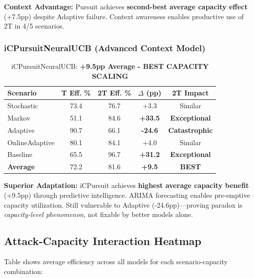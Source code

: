 \documentclass[11pt,a4paper]{article}
\newcommand{\critical}[1]{\textcolor{criticalcolor}{\textbf{#1}}}
\newcommand{\success}[1]{\textcolor{successcolor}{\textbf{#1}}}
\begin{document}
\vspace{-0.2cm}
\textbf{Context Advantage:} Pursuit achieves \success{second-best average capacity effect} (+7.5pp) despite Adaptive failure. Context awareness enables productive use of 2T in 4/5 scenarios.

\subsubsection{iCPursuitNeuralUCB (Advanced Context Model)}

\vspace{-0.4cm}
\begin{table}[H]
\scriptsize
\centering
\begin{tabular}{lcccc}
\toprule
\textbf{Scenario} & \textbf{T Eff. \%} & \textbf{2T Eff. \%} & \textbf{$\Delta$ (pp)} & \textbf{2T Impact} \\
\midrule
Stochastic & 73.4 & 76.7 & +3.3 & Similar \\
Markov & 51.1 & 84.6 & \success{+33.5} & \success{Exceptional} \\
Adaptive & 90.7 & 66.1 & \critical{-24.6} & \critical{Catastrophic} \\
OnlineAdaptive & 80.1 & 84.1 & +4.0 & Similar \\
Baseline & 65.5 & 96.7 & \success{+31.2} & \success{Exceptional} \\
\midrule
\textbf{Average} & 72.2 & 81.6 & \success{+9.5} & \success{BEST} \\
\bottomrule
\end{tabular}
\vspace{-0.2cm}
\caption{iCPursuitNeuralUCB: \success{+9.5pp Average - BEST CAPACITY SCALING}}
\end{table}

\vspace{-0.2cm}
\textbf{Superior Adaptation:} iCPursuit achieves \success{highest average capacity benefit} (+9.5pp) through predictive intelligence. ARIMA forecasting enables pre-emptive capacity utilization. Still vulnerable to Adaptive (-24.6pp)—proving paradox is \textit{capacity-level phenomenon}, not fixable by better models alone.

\newpage
\subsection{Attack-Capacity Interaction Heatmap}

Table shows average efficiency across all models for each scenario-capacity combination:
\end{document}
